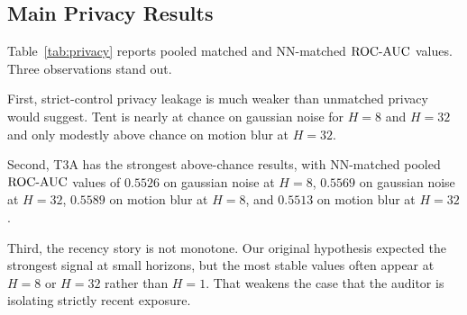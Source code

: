 \begin{table}[t]
\caption{Utility on CIFAR-10-C severity-5 streams. Results are mean $\pm$ sample standard deviation over three seeds. Gain is relative to the source-only baseline for the same corruption. Higher is better for all columns except gain can be negative.}
\label{tab:utility}
\centering
{}
\end{table}

\subsection{Main Privacy Results}

Table~\ref{tab:privacy} reports pooled matched and NN-matched $\mathrm{ROC\mbox{-}AUC}$ values. Three observations stand out.

First, strict-control privacy leakage is much weaker than unmatched privacy would suggest. Tent is nearly at chance on gaussian noise for $H=8$ and $H=32$ and only modestly above chance on motion blur at $H=32$.

Second, T3A has the strongest above-chance results, with NN-matched pooled $\mathrm{ROC\mbox{-}AUC}$ values of $0.5526$ on gaussian noise at $H=8$, $0.5569$ on gaussian noise at $H=32$, $0.5589$ on motion blur at $H=8$, and $0.5513$ on motion blur at $H=32$.

Third, the recency story is not monotone. Our original hypothesis expected the strongest signal at small horizons, but the most stable values often appear at $H=8$ or $H=32$ rather than $H=1$. That weakens the case that the auditor is isolating strictly recent exposure.

